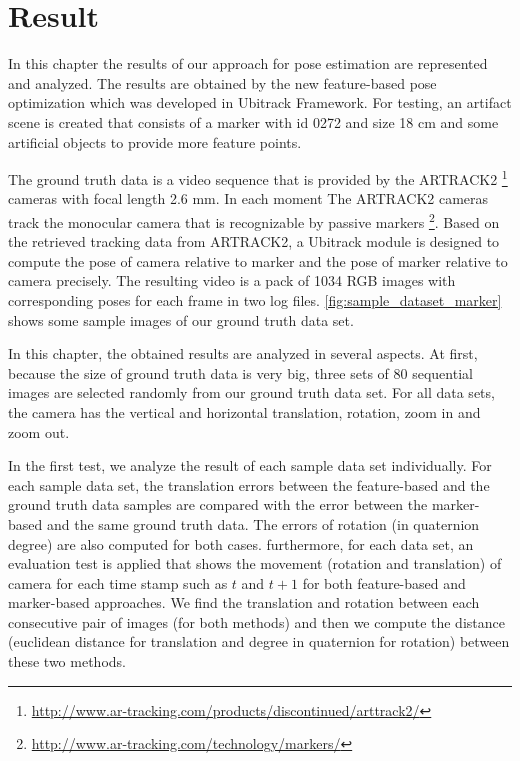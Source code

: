 \chapter{Result}\label{chapter:Result}
In this chapter the results of our approach for pose estimation are represented and analyzed. The results are obtained by the new feature-based pose optimization which was developed in Ubitrack Framework. For testing, an artifact scene is created that consists of a marker with id 0272 and size 18 cm and some artificial objects to provide more feature points.

The ground truth data is a video sequence that is provided by the ARTRACK2 \footnote{\url{http://www.ar-tracking.com/products/discontinued/arttrack2/}} cameras with focal length 2.6 mm. In each moment The ARTRACK2 cameras track the monocular camera that is recognizable by passive markers \footnote{\url{http://www.ar-tracking.com/technology/markers/}}. Based on the retrieved tracking data from ARTRACK2, a Ubitrack module is designed to compute the pose of camera relative to marker and the pose of marker relative to camera precisely. 
The resulting video is a pack of 1034 RGB images with corresponding poses for each frame in two log files. \autoref{fig:sample_dataset_marker} shows some sample images of our ground truth data set.

In this chapter, the obtained results are analyzed in several aspects. At first, because the size of ground truth data is very big, three sets of 80 sequential images are selected randomly from our ground truth data set. For all data sets, the camera has the vertical and horizontal translation, rotation, zoom in and zoom out.

In the first test, we analyze the result of each sample data set individually. For each sample data set, the translation errors between the feature-based and the ground truth data samples are compared with the error between the marker-based and the same ground truth data. The errors of rotation (in quaternion degree) are also computed for both cases. furthermore, for each data set, an evaluation test is applied that shows the movement (rotation and translation) of camera for each time stamp such as $t$ and $t+1$ for both feature-based and marker-based approaches. We find the translation and rotation between each consecutive pair of images (for both methods) and then we compute the distance (euclidean distance for translation and degree in quaternion for rotation) between these two methods. 

